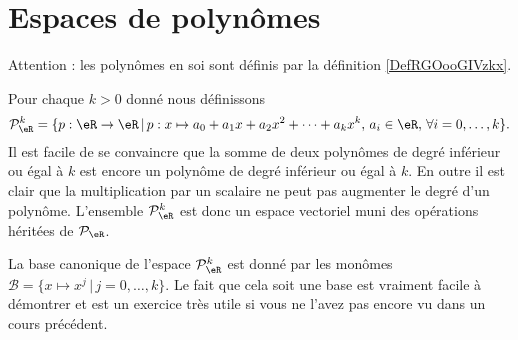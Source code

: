 \section{Espaces de polynômes}		
\label{SecEspacePolynomes}

Attention : les polynômes en soi sont définis par la définition \ref{DefRGOooGIVzkx}.

Pour chaque $k>0$ donné nous définissons
\begin{equation}
\mathcal{P}_\eR^k=\{p:\eR\to \eR\,|\, p : x\mapsto a_0+a_1 x +a_2 x^2 + \cdots+a_k x^k, \, a_i\in\eR,\,\forall i=0,\ldots,k\}.
\end{equation}   
Il est facile de se convaincre que la somme de deux polynômes de degré inférieur ou égal à $k$ est encore un polynôme de degré inférieur ou égal à $k$. En outre il est clair que la multiplication par un scalaire ne peut pas augmenter le degré d'un polynôme. L'ensemble $\mathcal{P}_\eR^k$ est donc un espace vectoriel muni des opérations héritées de $\mathcal{P}_{\eR}$. 

La base canonique de l'espace $\mathcal{P}_\eR^k$ est donné par les monômes $\mathcal{B}=\{x\mapsto x^j \,|\, j=0, \ldots, k\}$. Le fait que cela soit une base est vraiment facile à démontrer et est un exercice très utile si vous ne l'avez pas encore vu dans un cours précédent. 

